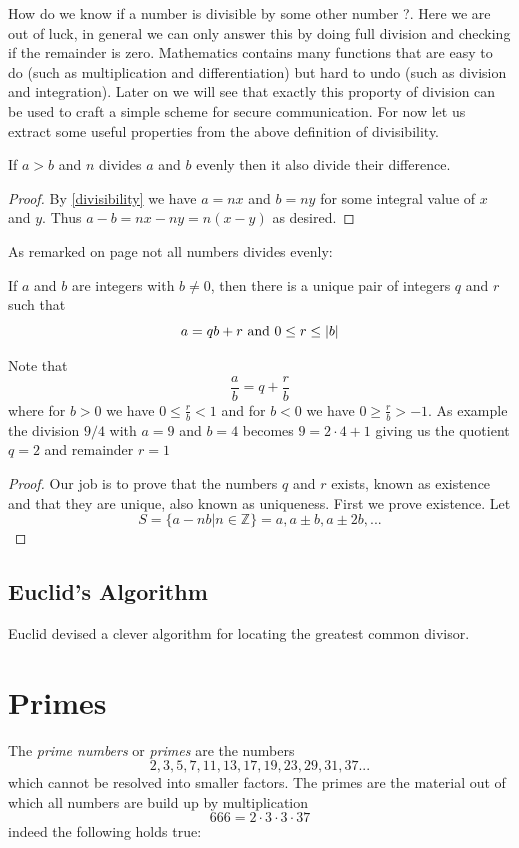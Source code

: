 How do we know if a number is divisible by some other number ?. Here we are out of luck, in general we can only answer this by doing full division and checking if the remainder is zero. Mathematics contains many functions that are easy to do (such as multiplication and differentiation) but hard to undo (such as division and integration). Later on we will see that exactly this proporty of division can be used to craft a simple scheme for secure communication. For now let us extract some useful properties from the above definition of divisibility.
\begin{proposition}
If $a > b$ and $n$ divides $a$ and $b$ evenly then it also divide their
difference.
\end{proposition}
\begin{proof}
By \ref{divisibility} we have $a = nx$ and  $b = ny$ for some integral value of $x$ and $y$. Thus $a-b = nx - ny = n(x-y)$ as desired.
\end{proof}

As remarked on page \pageref{remainder} not all numbers divides evenly:
\begin{proposition}\label{division_algorithm}
If $a$ and $b$ are integers with $b\neq0$, then there is a unique pair of integers $q$ and $r$ such that
\[
a = qb+r \textnormal{ and } 0 \leq r \leq |b|
\]
\end{proposition}
Note that
\[
\frac{a}{b} = q + \frac{r}{b}
\]
where for $b>0$ we have $0 \leq \frac{r}{b} < 1$ and for $b<0$ we have $0 \geq \frac{r}{b} > -1$. As example the division $9/4$ with $a=9$ and $b=4$ becomes $9=2\cdot4 + 1$ giving us the quotient $q=2$ and remainder $r=1$
\begin{proof}
Our job is to prove that the numbers $q$ and $r$ exists, known as existence and that they are unique, also known as uniqueness. First we prove existence. Let
\[
S = \{a-nb|n \in \mathbb{Z}\} = {a,a \pm b,a \pm 2b,...}
\]
\end{proof}

\subsection{Euclid's Algorithm}
Euclid devised a clever algorithm for locating the greatest common divisor.

\section{Primes}
The \textit{prime numbers} or \textit{primes} are the numbers
\[
2, 3, 5, 7, 11, 13, 17, 19, 23, 29, 31, 37 ...
\]
which cannot be resolved into smaller factors. The primes are the material out of which all numbers are build up by multiplication
\[
666 = 2 \cdot 3 \cdot 3 \cdot 37
\]
indeed the following holds true:

